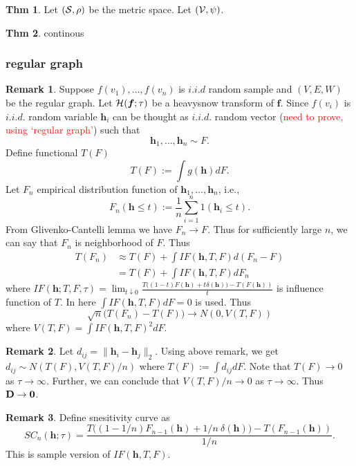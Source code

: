 \documentclass[preprint, review, 12pt]{article}
\theoremstyle{definition}
\newtheorem{thm}{Thm}[section]
\newtheorem{rmk}{Remark}[section]
\theoremstyle{remark}
\begin{document}
\begin{thm} 
Let $({\cal S},\rho)$ be the metric space. Let $({\cal V},\psi)$.  
\end{thm}

\begin{thm}
continous
\end{thm}

\subsubsection{regular graph}
\begin{rmk}
Suppose $f(v_1),\dots,f(v_n)$ is $i.i.d$ random sample and $(V,E,W)$ be the regular graph. Let ${\cal H}(\boldsymbol{f};\tau)$ be a heavysnow transform of ${\boldsymbol f}$. Since $f(v_i)$ is $i.i.d.$ random variable ${\boldsymbol h}_i$ can be thought as $i.i.d.$ random vector (\textcolor{red}{need to prove, using `regular graph'}) such that 
\[
{\boldsymbol h}_1,\dots,{\boldsymbol h}_n \sim F.
\] 
Define functional $T(F)$
\[
T(F):=\int g({\boldsymbol h}) dF.
\]
Let $F_n$ empirical distribution function of ${\boldsymbol h}_1,\dots,{\boldsymbol h}_n$, i.e., 
\[
F_n({\boldsymbol h}\leq t ) :=\frac{1}{n}\sum_{i=1}^{n}1({\boldsymbol h}_i\leq t).
\]
From Glivenko-Cantelli lemma we have $F_n \to F$. Thus for sufficiently large $n$, we can say that $F_n$ is neighborhood of $F$. Thus 
\begin{align*}
T(F_n) & \approx  T(F)+\int IF(\boldsymbol{h},T,F)d(F_n-F) \\
& = T(F)+\int IF(\boldsymbol{h},T,F) dF_n
\end{align*}
where $IF({\boldsymbol h}; T,F,\tau)= \lim_{t\downarrow 0}\frac{T\big((1-t)F(\boldsymbol{h}) + t \delta(\boldsymbol{h}) \big)-T(F(\boldsymbol{h}))}{t}$ is influence function of $T$. In here $\int IF(\boldsymbol{h},T,F)dF=0$ is used. Thus 
\[
\sqrt{n}\Big(T(F_n)-T(F) \Big) \to N(0,V(T,F))
\]
where $V(T,F)=\int IF(\boldsymbol{h},T,F)^2 dF$.
\end{rmk}

\begin{rmk}
Let $d_{ij}=\|{\boldsymbol h}_i-{\boldsymbol h}_j\|_2$. Using above remark, we get $d_{ij} \sim N(T(F),V(T,F)/n)$ where $T(F):=\int d_{ij}dF$. Note that $T(F) \to 0 $ as $\tau \to \infty$. Further, we can conclude that $V(T,F)/n \to 0$ as $\tau \to \infty$. Thus ${\bf D} \to {\bf 0}$. 
\end{rmk}

\begin{rmk}
Define snesitivity curve as 
\[
SC_{n}({\boldsymbol h};\tau)= \frac{T\big((1-1/n)F_{n-1}(\boldsymbol{h}) + 1/n ~ \delta(\boldsymbol{h}) \big)-T(F_{n-1}(\boldsymbol{h}))}{1/n}.
\]
This is sample version of $IF({\boldsymbol h},T,F)$.
\end{rmk}
\end{document}
